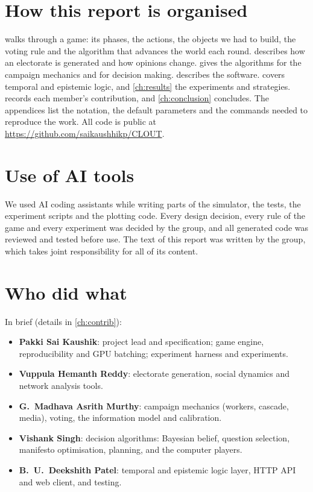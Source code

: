 \documentclass[11pt,a4paper,oneside]{report}
\newcommand{\repo}{\url{https://github.com/saikaushhikp/CLOUT}}
\begin{document}
\section{How this report is organised}

 walks through a game: its phases, the actions, the objects we had to build, the voting
rule and the algorithm that advances the world each round.  describes how an
electorate is generated and how opinions change.  gives the algorithms for the
campaign mechanics and for decision making.  describes the software. 
covers temporal and epistemic logic, and \cref{ch:results} the experiments and strategies.
 records each member's contribution, and \cref{ch:conclusion} concludes. The appendices
list the notation, the default parameters and the commands needed to reproduce the work. All code is
public at \repo.

\section{Use of AI tools}

We used AI coding assistants while writing parts of the simulator, the tests, the experiment scripts and
the plotting code. Every design decision, every rule of the game and every experiment was decided by the
group, and all generated code was reviewed and tested before use. The text of this report was written by
the group, which takes joint responsibility for all of its content.

\section{Who did what}

In brief (details in \cref{ch:contrib}):
\begin{itemize}
  \item \textbf{Pakki Sai Kaushik}: project lead and specification; game engine, reproducibility and GPU
        batching; experiment harness and experiments.
  \item \textbf{Vuppula Hemanth Reddy}: electorate generation, social dynamics and network analysis tools.
  \item \textbf{G.~Madhava Asrith Murthy}: campaign mechanics (workers, cascade, media), voting, the
        information model and calibration.
  \item \textbf{Vishank Singh}: decision algorithms: Bayesian belief, question selection, manifesto
        optimisation, planning, and the computer players.
  \item \textbf{B.~U.~Deekshith Patel}: temporal and epistemic logic layer, HTTP API and web client, and
        testing.
\end{itemize}
\end{document}
